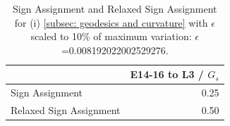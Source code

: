 \begin{table}
\caption{Sign Assignment and Relaxed Sign Assignment for (i) \cref{subsec: geodesics and curvature} with $\epsilon$ scaled to 10\% of maximum variation: $\epsilon$=0.008192022002529276.}
\label{tab: Sign Assigments (i)10 percent}
\begin{tabular}{lr}
\toprule
 & E14-16 to L3 / $G_s$ \\
\midrule
Sign Assignment & 0.25 \\
Relaxed Sign Assignment & 0.50 \\
\bottomrule
\end{tabular}
\end{table}

